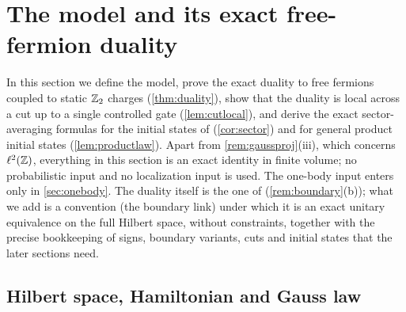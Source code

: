 \providecommand{\sxb}[1]{\sigma^{x}_{b_{#1}}}
\providecommand{\szb}[1]{\sigma^{z}_{b_{#1}}}
\providecommand{\taux}[1]{\tau^{x}_{#1}}
\providecommand{\tauz}[1]{\tau^{z}_{#1}}
\providecommand{\cdr}{\tilde c}
\providecommand{\LinkS}{\mathcal{S}}
\providecommand{\SiteT}{\mathcal{T}}

\section{The model and its exact free-fermion duality}\label{sec:model}

In this section we define the model, prove the exact duality to free fermions coupled to static
$\mathbb{Z}_2$ charges (\cref{thm:duality}), show that the duality is local across a cut up to a single
controlled gate (\cref{lem:cutlocal}), and derive the exact sector-averaging formulas for the
initial states of \cite{SKKM2017} (\cref{cor:sector}) and for general product initial states
(\cref{lem:productlaw}).  Apart from \cref{rem:gaussproj}(iii), which concerns $\ell^2(\mathbb{Z})$, everything
in this section is an exact identity in finite volume; no probabilistic input and no localization input is
used.  The one-body input enters only in \cref{sec:onebody}.  The duality itself is the one of
\cite{SKKM2017} (\cref{rem:boundary}(b)); what we add is a convention (the boundary link) under which it
is an exact unitary equivalence on the full Hilbert space, without constraints, together with the
precise bookkeeping of signs, boundary variants, cuts and initial states that the later sections need.

\subsection{Hilbert space, Hamiltonian and Gauss law}\label{sec:model:def}

